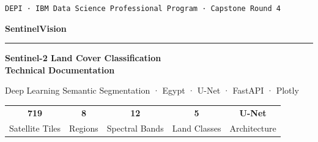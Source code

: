\documentclass[12pt, a4paper]{article}
\begin{document}

\begin{titlepage}
\pagecolor{navyblue}
\color{white}
\centering

\vspace*{1.8cm}

\begin{tcolorbox}[
  width=0.52\textwidth,
  colback=white!10!navyblue,
  colframe=emerald,
  halign=center, sharp corners,
  boxsep=5pt, left=0pt, right=0pt,
]
  \texttt{\small DEPI · IBM Data Science Professional Program · Capstone Round 4}
\end{tcolorbox}

\vspace{1.6cm}

{\fontsize{44}{52}\bfseries\selectfont SentinelVision}

\vspace{0.5cm}
{\color{emerald}\rule{0.55\linewidth}{2pt}}
\vspace{0.5cm}

{\LARGE\bfseries Sentinel-2 Land Cover Classification}\\[0.35em]
{\large\bfseries Technical Documentation}

\vspace{0.4cm}
{\color{white!60}\normalsize
  Deep Learning Semantic Segmentation · Egypt · U-Net · FastAPI · Plotly}

\vspace{2.5cm}

\begin{tcolorbox}[
  width=0.72\textwidth,
  colback=white!7!navyblue,
  colframe=white!18!navyblue,
  halign=center, sharp corners,
  boxsep=12pt,
]
  \renewcommand{\arraystretch}{1.4}
  \begin{tabular}{ccccc}
    {\large\bfseries 719} &
    {\large\bfseries 8} &
    {\large\bfseries 12} &
    {\large\bfseries 5} &
    {\large\bfseries U-Net} \\[2pt]
    {\footnotesize Satellite Tiles} &
    {\footnotesize Regions} &
    {\footnotesize Spectral Bands} &
    {\footnotesize Land Classes} &
    {\footnotesize Architecture}
  \end{tabular}
\end{tcolorbox}

\vspace{2.5cm}


\end{titlepage}
\end{document}
